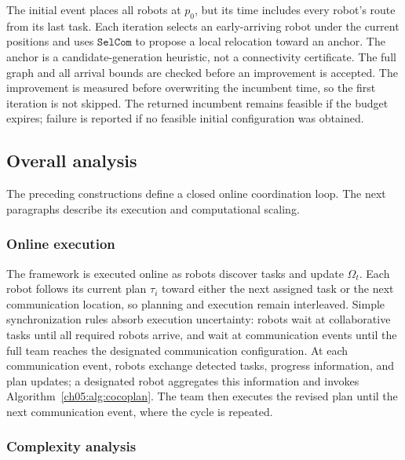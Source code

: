 \begin{revision}
The initial event places all robots at $p_0$, but its time includes every
robot's route from its last task. Each iteration selects an early-arriving
robot under the current positions and uses $\texttt{SelCom}$ to propose a
local relocation toward an anchor. The anchor is a candidate-generation
heuristic, not a connectivity certificate. The full graph and all arrival
bounds are checked before an improvement is accepted. The improvement is
measured before overwriting the incumbent time, so the first iteration is
not skipped. The returned incumbent remains feasible if the budget expires;
failure is reported if no feasible initial configuration was obtained.
\end{revision}

\subsection{Overall analysis}
\label{ch05:subsec:online}

The preceding constructions define a closed online coordination loop. The next
paragraphs describe its execution and computational scaling.

\subsubsection{Online execution}
\label{ch05:subsubsec:online-execution}

The framework is executed online as robots discover tasks and update
$\Omega_t$. Each robot follows its current plan $\tau_i$ toward either the next
assigned task or the next communication location, so planning and execution
remain interleaved. Simple synchronization rules absorb execution uncertainty:
robots wait at collaborative tasks until all required robots arrive, and wait at
communication events until the full team reaches the designated communication
configuration.  At each communication event, robots exchange detected
tasks, progress information, and plan updates; a designated robot aggregates
this information and invokes Algorithm~\ref{ch05:alg:cocoplan}. The team then
executes the revised plan until the next communication event, where the cycle is
repeated.

\subsubsection{Complexity analysis}
\label{ch05:subsubsec:complexity}

